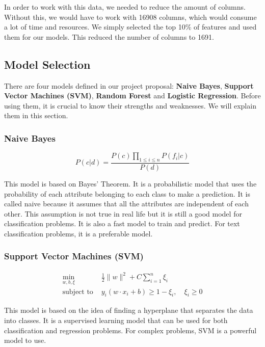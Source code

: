 \documentclass[conference]{IEEEtran}
\begin{document}
In order to work with this data, we needed to reduce the amount of columns. Without this, we would have to work with 16908 columns, which would consume a lot of time and resources. We simply selected the top 10\% of features and used them for our models. This reduced the number of columns to 1691.

\subsection{Model Selection}

There are four models defined in our project proposal: \textbf{Naive Bayes}, \textbf{Support Vector Machines (SVM)}, \textbf{Random Forest} and \textbf{Logistic Regression}. Before using them, it is crucial to know their strengths and weaknesses. We will explain them in this section.

\subsubsection{Naive Bayes}

\begin{equation*}
    P(c|d) = \frac{P(c) \prod_{1 \leq i \leq n} P(f_i|c)}{P(d)}
\end{equation*}

This model is based on Bayes' Theorem. It is a probabilistic model that uses the probability of each attribute belonging to each class to make a prediction. It is called naive because it assumes that all the attributes are independent of each other. This assumption is not true in real life but it is still a good model for classification problems. It is also a fast model to train and predict. For text classification problems, it is a preferable model.

\subsubsection{Support Vector Machines (SVM)}

\begin{align*}
    \min_{w, b, \xi}\text{ } & \frac{1}{2} \| w \|^2 + C \sum_{i=1}^{n} \xi_i \\
    \text{subject to } & y_i (w \cdot x_i + b) \geq 1 - \xi_i, \quad \xi_i \geq 0
\end{align*}

This model is based on the idea of finding a hyperplane that separates the data into classes. It is a supervised learning model that can be used for both classification and regression problems. For complex problems, SVM is a powerful model to use.
\end{document}
